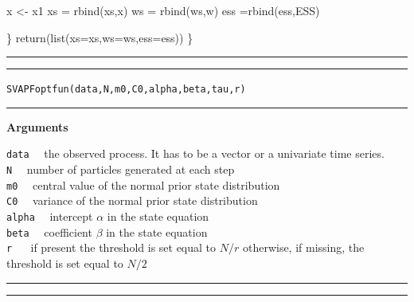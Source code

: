 \documentclass[
]{book}
\newenvironment{Shaded}{\begin{snugshade}}{\end{snugshade}}
\newcommand{\AttributeTok}[1]{\textcolor[rgb]{0.77,0.63,0.00}{#1}}
\newcommand{\FunctionTok}[1]{\textcolor[rgb]{0.00,0.00,0.00}{#1}}
\newcommand{\NormalTok}[1]{#1}
\newcommand{\OtherTok}[1]{\textcolor[rgb]{0.56,0.35,0.01}{#1}}
\theoremstyle{break}
\theoremstyle{nonumberplain}
\begin{document}
\begin{Shaded}
\begin{Highlighting}[]
\NormalTok{    x }\OtherTok{\textless{}{-}}\NormalTok{ x1}
\NormalTok{    xs }\OtherTok{=} \FunctionTok{rbind}\NormalTok{(xs,x)}
\NormalTok{    ws }\OtherTok{=} \FunctionTok{rbind}\NormalTok{(ws,w)}
\NormalTok{    ess }\OtherTok{=}\FunctionTok{rbind}\NormalTok{(ess,ESS)}
    
\NormalTok{  \}}
  \FunctionTok{return}\NormalTok{(}\FunctionTok{list}\NormalTok{(}\AttributeTok{xs=}\NormalTok{xs,}\AttributeTok{ws=}\NormalTok{ws,}\AttributeTok{ess=}\NormalTok{ess))}
\NormalTok{\}}
\end{Highlighting}
\end{Shaded}

\hrule
\hrule

\hfill\break
\texttt{SVAPFoptfun(data,N,m0,C0,alpha,beta,tau,r)}\\

\hrule

\textbf{Arguments}

\texttt{data} ~~the observed process. It has to be a vector or a
univariate time series.\\
\texttt{N} ~~number of particles generated at each step\\
\texttt{m0} ~~central value of the normal prior state distribution\\
\texttt{C0} ~~variance of the normal prior state distribution\\
\texttt{alpha} ~~intercept \(\alpha\) in the state equation\\
\texttt{beta} ~~coefficient \(\beta\) in the state equation\\
\texttt{r} ~~ if present the threshold is set equal to \(N/r\)
otherwise, if missing, the threshold is set equal to \(N/2\)

\hrule
\hrule
\end{document}
